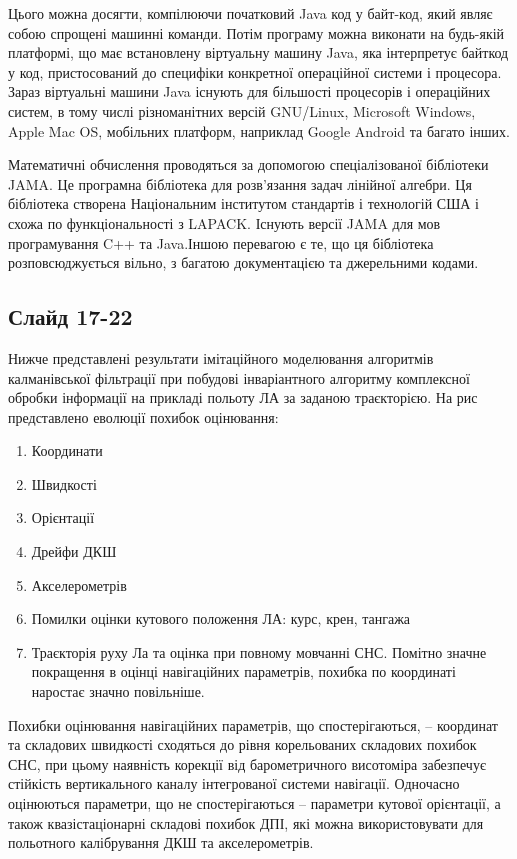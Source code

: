 \documentclass[ukrainian,utf8,simple,floatsubsection, hpadding=1mm,equationsubsection,12pt]{eskdtext}
\begin{document}
Цього можна досягти, компілюючи початковий Java код у байт-код, який являє собою спрощені машинні команди. Потім програму можна виконати на будь-якій платформі, що має встановлену віртуальну машину Java, яка інтерпретує байткод у код, пристосований до специфіки конкретної операційної системи і процесора. Зараз віртуальні машини Java існують для більшості процесорів і операційних систем, в тому числі різноманітних версій GNU/Linux, Microsoft Windows, Apple Mac OS, мобільних платформ, наприклад Google Android та багато інших.

Математичні обчислення проводяться за допомогою спеціалізованої бібліотеки JAMA. Це програмна бібліотека для розв'язання задач лінійної алгебри. Ця бібліотека створена Національним інститутом стандартів і технологій США і схожа по функціональності з LAPACK. Існують версії JAMA для мов програмування C++ та Java.Іншою перевагою є те, що ця бібліотека розповсюджується вільно, з багатою документацією та джерельними кодами.

\subsection*{Слайд 17-22}
Нижче представлені результати імітаційного моделювання алгоритмів калманівської фільтрації при побудові інваріантного алгоритму комплексної обробки інформації на прикладі польоту ЛА за заданою траєкторією. На рис  представлено еволюції похибок оцінювання:

\begin{enumerate}
 \item Координати
 \item Швидкості
 \item Орієнтації
 \item Дрейфи ДКШ
 \item Акселерометрів
 \item Помилки оцінки кутового положення ЛА: курс, крен, тангажа
 \item Траєкторія руху Ла та оцінка при повному мовчанні СНС. Помітно значне покращення в оцінці навігаційних параметрів, похибка по координаті наростає значно повільніше.
\end{enumerate}

Похибки оцінювання навігаційних параметрів, що спостерігаються, -- координат та складових швидкості сходяться до рівня корельованих складових похибок СНС, при цьому наявність корекції від барометричного висотоміра забезпечує стійкість вертикального каналу інтегрованої системи навігації. Одночасно оцінюються параметри, що не спостерігаються -- параметри кутової орієнтації, а також квазістаціонарні складові похибок ДПІ, які можна використовувати для польотного калібрування ДКШ та акселерометрів. 
\end{document}
